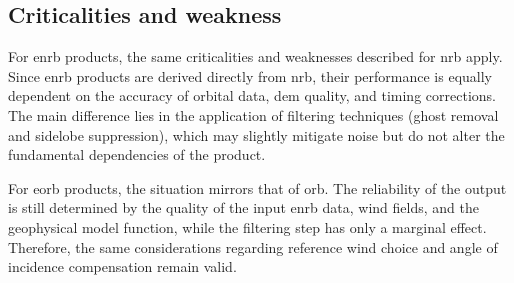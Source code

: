 \subsection{Criticalities and weakness}
\label{sec:enh_criticalities}
For \acs{enrb} products, the same criticalities and weaknesses described for \acs{nrb} apply. Since \acs{enrb} products are derived directly from \acs{nrb}, their performance is equally dependent on the accuracy of orbital data, \acs{dem} quality, and timing corrections. The main difference lies in the application of filtering techniques (ghost removal and sidelobe suppression), which may slightly mitigate noise but do not alter the fundamental dependencies of the product.

For \acs{eorb} products, the situation mirrors that of \acs{orb}. The reliability of the output is still determined by the quality of the input \acs{enrb} data, wind fields, and the geophysical model function, while the filtering step has only a marginal effect. Therefore, the same considerations regarding reference wind choice and angle of incidence compensation remain valid.
